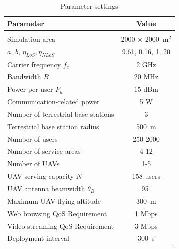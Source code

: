 \documentclass[a4paper,12pt]{report}
\begin{document}
\begin{table} [t!]
    \centering
    \caption{Parameter settings}
    \label{table:Parameter Settings}
    \begin{tabularx}{0.65\linewidth}{l c}
    \toprule
    \textbf{Parameter} & \textbf{Value}\\
    \midrule
    \\ [-2em]
    Simulation area                                     & 2000 $\times$ 2000~m$^2$            \\ [0.5ex]
    $a$, $b$, $\eta _{LoS}, \eta _{NLoS}$ \cite{b8}     & 9.61, 0.16, 1, 20                   \\ [0.5ex]
    Carrier frequency $f_c$                             & 2 GHz                               \\ [0.5ex]
    Bandwidth $B$                                       & 20 MHz                              \\ [0.5ex]
    Power per user $P_u$                                & 15 dBm                              \\ [0.5ex]
    Communication-related power \cite{b22}              & 5 W                                 \\ [0.5ex]
    Number of terrestrial base stations                 & 3                                   \\ [0.5ex]
    Terrestrial base station radius                     & 500~m                               \\ [0.5ex]
    Number of users                                     & 250-2000                            \\ [0.5ex]
    Number of service areas                             & 4-12                                \\ [0.5ex]
    Number of UAVs                                      & 1-5                                 \\ [0.5ex]
    UAV serving capacity $N$                            & 158 users                           \\ [0.5ex]
    UAV antenna beamwidth $\theta_B$ \cite{b14}         & 95$^{\circ}$                        \\ [0.5ex]
    Maximum UAV flying altitude \cite{b23}              & 300~m                               \\ [0.5ex]
    Web browsing QoS Requirement \cite{b26}             & 1 Mbps                              \\ [0.5ex]
    Video streaming QoS Requirement \cite{b26}          & 3 Mbps                              \\ [0.5ex]
    Deployment interval                                 & 300~s                               \\ [0.5ex]
    \bottomrule
    \end{tabularx}
\end{table}
\end{document}
